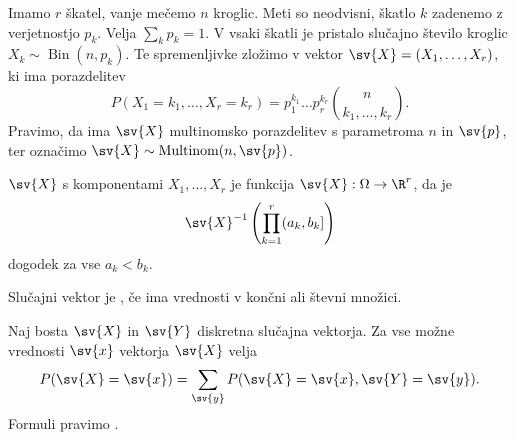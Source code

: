 
\begin{primer}
  Imamo $r$ škatel, vanje mečemo $n$ kroglic.
  Meti so neodvisni, škatlo $k$ zadenemo z verjetnostjo $p_k$.
  Velja $\sum_{k} p_k = 1$.
  V vsaki škatli je pristalo slučajno število kroglic $X_k \sim
  \operatorname{Bin}(n, p_k)$.
  Te spremenljivke zložimo v vektor $\sv{X} = (X_1, \ldots, X_r)$, ki ima
  porazdelitev
  \[
	P(X_1 = k_1, \ldots, X_r = k_r) = p_1^{k_1} \ldots p_r^{k_r} \binom{n}{k_1,
	  \ldots, k_r}.
  \]
  Pravimo, da ima $\sv{X}$ multinomsko porazdelitev s parametroma $n$ in
  $\sv{p}$, ter označimo $\sv{X} \sim \operatorname{Multinom}(n, \sv{p})$.
\end{primer}


\begin{definicija}
   $\sv{X}$ s komponentami $X_1, \ldots, X_r$ je funkcija
  $\sv{X}: \Omega \to \R^r$, da je
  \[
	\sv{X}^{-1}\left( \prod_{k=1}^r (a_k, b_k] \right)
  \]
  dogodek za vse $a_k < b_k$.
\end{definicija}

\begin{definicija}
  Slučajni vektor je , če ima vrednosti v končni ali števni
  množici.
\end{definicija}


\begin{izrek}
  Naj bosta $\sv{X}$ in $\sv{Y}$ diskretna slučajna vektorja.
  Za vse možne vrednosti $\sv{x}$ vektorja $\sv{X}$ velja
  \[
	P(\sv{X} = \sv{x}) = \sum_{\sv{y}} P(\sv{X} = \sv{x}, \sv{Y} = \sv{y}).
  \]
  Formuli pravimo .
\end{izrek}


